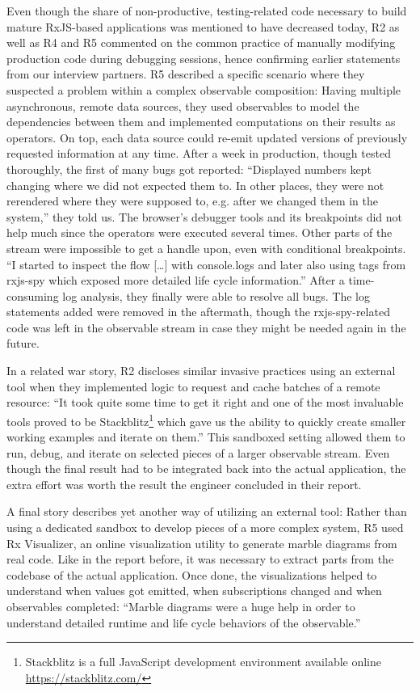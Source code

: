 \documentclass[sigplan,screen,review]{acmart}
\begin{document}
Even though the share of non-productive, testing-related code necessary to build mature RxJS-based applications was mentioned to have decreased today, R2 as well as R4 and R5 commented on the common practice of manually modifying production code during debugging sessions, hence confirming earlier statements from our interview partners. R5 described a specific scenario where they suspected a problem within a complex observable composition: Having multiple asynchronous, remote data sources, they used observables to model the dependencies between them and implemented computations on their results as operators. On top, each data source could re-emit updated versions of previously requested information at any time. After a week in production, though tested thoroughly, the first of many bugs got reported: ``Displayed numbers kept changing where we did not expected them to. In other places, they were not rerendered where they were supposed to, e.g. after we changed them in the system,'' they told us. The browser's debugger tools and its breakpoints did not help much since the operators were executed several times. Other parts of the stream were impossible to get a handle upon, even with conditional breakpoints. ``I started to inspect the flow [\dots] with console.logs and later also using tags from rxjs-spy which exposed more detailed life cycle information.'' After a time-consuming log analysis, they finally were able to resolve all bugs. The log statements added were removed in the aftermath, though the rxjs-spy-related code was left in the observable stream in case they might be needed again in the future.

In a related war story, R2 discloses similar invasive practices using an external tool when they implemented logic to request and cache batches of a remote resource: ``It took quite some time to get it right and one of the most invaluable tools proved to be Stackblitz\footnote{Stackblitz is a full JavaScript development environment available online \url{https://stackblitz.com/}} which gave us the ability to quickly create smaller working examples and iterate on them.'' This sandboxed setting allowed them to run, debug, and iterate on selected pieces of a larger observable stream. Even though the final result had to be integrated back into the actual application, the extra effort was worth the result the engineer concluded in their report.

A final story describes yet another way of utilizing an external tool: Rather than using a dedicated sandbox to develop pieces of a more complex system, R5 used Rx Visualizer, an online visualization utility to generate marble diagrams from real code. Like in the report before, it was necessary to extract parts from the codebase of the actual application. Once done, the visualizations helped to understand when values got emitted, when subscriptions changed and when observables completed: ``Marble diagrams were a huge help in order to understand detailed runtime and life cycle behaviors of the observable.''
\end{document}
